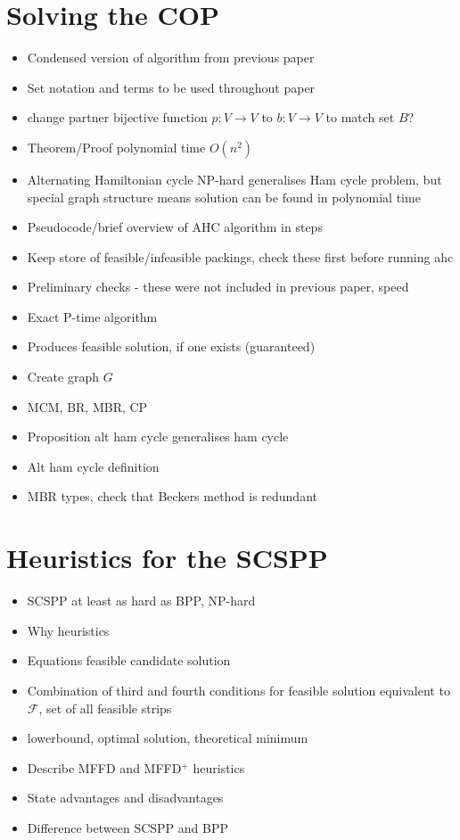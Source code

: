 \documentclass{elsarticle}
\begin{document}
\section{Solving the COP}
\begin{itemize}
	\item Condensed version of algorithm from previous paper
	\item Set notation and terms to be used throughout paper
	\item change partner bijective function $p:V \to V$ to $b : V \to V$ to match set $B$?
	\item Theorem/Proof polynomial time $O(n^2)$
	\item Alternating Hamiltonian cycle NP-hard generalises Ham cycle problem, but special graph structure means solution can be found in polynomial time
	\item Pseudocode/brief overview of AHC algorithm in steps
	\item Keep store of feasible/infeasible packings, check these first before running ahc
	\item Preliminary checks - these were not included in previous paper, speed
	\item Exact P-time algorithm
	\item Produces feasible solution, if one exists (guaranteed)
	\item Create graph $G$
	\item MCM, BR, MBR, CP
	\item Proposition alt ham cycle generalises ham cycle
	\item Alt ham cycle definition
	\item MBR types, check that Beckers method is redundant
\end{itemize}

\section{Heuristics for the SCSPP}
\begin{itemize}
	\item SCSPP at least as hard as BPP, NP-hard
	\item Why heuristics
	\item Equations feasible candidate solution
	\item Combination of third and fourth conditions for feasible solution equivalent to $\mathcal{F}$, set of all feasible strips
	\item lowerbound, optimal solution, theoretical minimum
	\item Describe MFFD and MFFD$^+$ heuristics
	\item State advantages and disadvantages
	\item Difference between SCSPP and BPP
\end{itemize}
\end{document}
